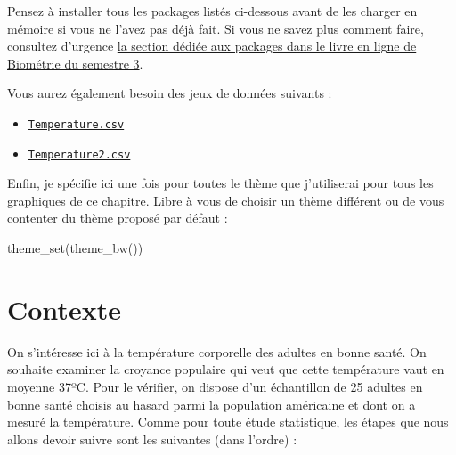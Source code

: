 \documentclass[
  a4paper,
  DIV=11,
  numbers=noendperiod,
  oneside]{scrreprt}
\newenvironment{Shaded}{}{}
\newcommand{\FunctionTok}[1]{\textcolor[rgb]{0.44,0.26,0.76}{#1}}
\newcommand{\NormalTok}[1]{\textcolor[rgb]{0.14,0.16,0.18}{#1}}
\providecommand{\tightlist}{%
  \setlength{\itemsep}{0pt}\setlength{\parskip}{0pt}}\usepackage{longtable,booktabs,array}
\begin{document}
\begin{tcolorbox}[enhanced jigsaw, breakable, toprule=.15mm, colbacktitle=quarto-callout-important-color!10!white, colframe=quarto-callout-important-color-frame, arc=.35mm, bottomtitle=1mm, opacityback=0, title=\textcolor{quarto-callout-important-color}{\faExclamation}\hspace{0.5em}{Attention}, bottomrule=.15mm, colback=white, toptitle=1mm, rightrule=.15mm, leftrule=.75mm, opacitybacktitle=0.6, left=2mm, titlerule=0mm, coltitle=black]

Pensez à installer tous les packages listés ci-dessous avant de les
charger en mémoire si vous ne l'avez pas déjà fait. Si vous ne savez
plus comment faire, consultez d'urgence
\href{https://besibo.github.io/BiometrieS3/01-R-basics.html\#sec-packages}{la
section dédiée aux packages dans le livre en ligne de Biométrie du
semestre 3}.

\end{tcolorbox}

Vous aurez également besoin des jeux de données suivants :

\begin{itemize}
\tightlist
\item
  \href{data/Temperature.csv}{\texttt{Temperature.csv}}
\item
  \href{data/Temperature2.csv}{\texttt{Temperature2.csv}}
\end{itemize}

Enfin, je spécifie ici une fois pour toutes le thème que j'utiliserai
pour tous les graphiques de ce chapitre. Libre à vous de choisir un
thème différent ou de vous contenter du thème proposé par défaut :

\begin{Shaded}
\begin{Highlighting}[]
\FunctionTok{theme\_set}\NormalTok{(}\FunctionTok{theme\_bw}\NormalTok{())}
\end{Highlighting}
\end{Shaded}

\hypertarget{contexte}{%
\section{Contexte}\label{contexte}}

On s'intéresse ici à la température corporelle des adultes en bonne
santé. On souhaite examiner la croyance populaire qui veut que cette
température vaut en moyenne 37ºC. Pour le vérifier, on dispose d'un
échantillon de 25 adultes en bonne santé choisis au hasard parmi la
population américaine et dont on a mesuré la température. Comme pour
toute étude statistique, les étapes que nous allons devoir suivre sont
les suivantes (dans l'ordre) :
\end{document}
